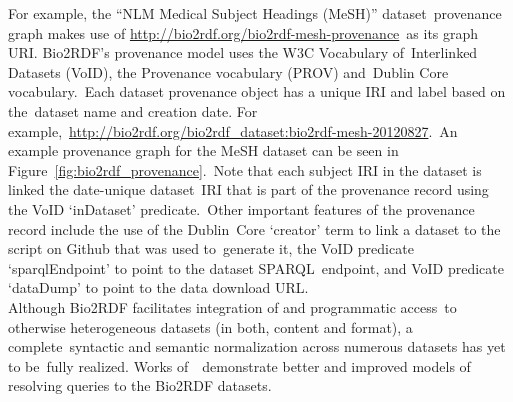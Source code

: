   \noindent For example, the ``NLM Medical Subject Headings (MeSH)'' dataset\
  provenance graph makes use of \url{http://bio2rdf.org/bio2rdf-mesh-provenance}\
  as its graph URI. Bio2RDF's provenance model uses the W3C Vocabulary of\
  Interlinked Datasets (VoID), the Provenance vocabulary (PROV) and\
  Dublin Core vocabulary.\
  Each dataset provenance object has a unique IRI and label based on the\
  dataset name and creation date. For example,\
  \url{http://bio2rdf.org/bio2rdf_dataset:bio2rdf-mesh-20120827}.\
  An example provenance graph for the MeSH dataset can be seen in Figure~\ref{fig:bio2rdf_provenance}.\
  Note that each subject IRI in the dataset is linked the date-unique dataset\
  IRI that is part of the provenance record using the VoID `inDataset' predicate.\
  Other important features of the provenance record include the use of the Dublin\
  Core `creator' term to link a dataset to the script on Github that was used to\
  generate it, the VoID predicate `sparqlEndpoint' to point to the dataset SPARQL\
  endpoint, and VoID predicate `dataDump' to point to the data download URL.\\
  
  \noindent Although Bio2RDF facilitates integration of and programmatic access\
  to otherwise heterogeneous datasets (in both, content and format), a complete\
  syntactic and semantic normalization across numerous datasets has yet to be\
  fully realized. Works of~\citep{ansell_model_2011, callahan_ontology-based_2013, castro_biotea:_2013}\
  demonstrate better and improved models of resolving queries to the Bio2RDF datasets.\\
